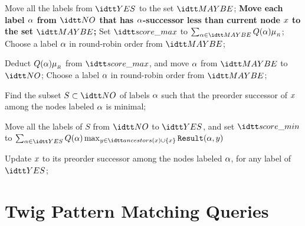   \begin{algorithm}
    \begin{algorithmic}
      \caption{$(\nodex,\setYES,\setNO,\setMAYBE,\scoremin,\scoremax)$}
      \label{alg:choiceMLT}
      \STATE Move all the labels from $\setYES$ to the set
      $\setMAYBE$; \STATE \textbf{Move each label $\alpha$ from
        $\setNO$ that has $\alpha$-successor less than current node
        $x$ to the set $\setMAYBE$;} \STATE Set $\scoremax$ to
      $\sum_{\labelx\in\setMAYBE}\Q(\labelx)\maxWeightR$; \STATE
      Choose a label $\alpha$ in round-robin order from $\setMAYBE$;

       \STATE
      Deduct $Q(\alpha)\mu_{_{R}}$ from $\scoremax$, and move
      $\alpha$ from $\setMAYBE$ to $\setNO$; \STATE Choose a label
      $\alpha$ in round-robin order from $\setMAYBE$; \ENDWHILE

      \STATE Find the subset $S\subset\setNO$ of labels $\alpha$ such
      that the preorder successor of $x$ among the nodes labeled
      $\alpha$ is minimal;

      \STATE Move all the labels of $S$ from $\setNO$ to $\setYES$,
      and set $\scoremin$ to
      $\sum_{\labelx\in\setYES}\Q(\labelx)\max_{\nodey\in\ancestors(x)\cup\{\nodex\}}{\R(\labelx,\nodey)}$
      
      \STATE Update $x$ to its preorder successor among the nodes
      labeled $\alpha$, for any label of $\setYES$;
    \end{algorithmic}
  \end{algorithm}









\section{Twig Pattern Matching Queries}
\label{sec:twig-patt-match}


